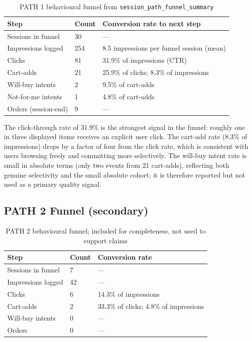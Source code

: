 \begin{table}[H]
\centering
\begin{tabular}{p{3.5cm}p{2cm}p{4.5cm}}
\toprule
\textbf{Step} & \textbf{Count} & \textbf{Conversion rate to next step}\\
\midrule
Sessions in funnel  & 30 & ---\\
Impressions logged   & 254 & 8.5 impressions per funnel session (mean)\\
Clicks               & 81 & 31.9\% of impressions (CTR)\\
Cart-adds            & 21 & 25.9\% of clicks; 8.3\% of impressions\\
Will-buy intents     & 2 & 9.5\% of cart-adds\\
Not-for-me intents   & 1 & 4.8\% of cart-adds\\
Orders (session-end) & 9 & ---\\
\bottomrule
\end{tabular}
\caption{PATH 1 behavioural funnel from \texttt{session\_path\_funnel\_summary}}
\label{tab:path1_funnel}
\end{table}

The click-through rate of 31.9\% is the strongest signal in the funnel: roughly one in three displayed items receives an explicit user click. The cart-add rate (8.3\% of impressions) drops by a factor of four from the click rate, which is consistent with users browsing freely and committing more selectively. The will-buy intent rate is small in absolute terms (only two events from 21 cart-adds), reflecting both genuine selectivity and the small absolute cohort; it is therefore reported but not used as a primary quality signal.

\subsection{PATH 2 Funnel (secondary)}
\label{subsec:path2_funnel}

\begin{table}[H]
\centering
\begin{tabular}{p{3.5cm}p{2cm}p{4.5cm}}
\toprule
\textbf{Step} & \textbf{Count} & \textbf{Conversion rate}\\
\midrule
Sessions in funnel & 7 & ---\\
Impressions logged & 42 & ---\\
Clicks             & 6 & 14.3\% of impressions\\
Cart-adds          & 2 & 33.3\% of clicks; 4.8\% of impressions\\
Will-buy intents   & 0 & ---\\
Orders             & 0 & ---\\
\bottomrule
\end{tabular}
\caption{PATH 2 behavioural funnel; included for completeness, not used to support claims}
\label{tab:path2_funnel}
\end{table}

